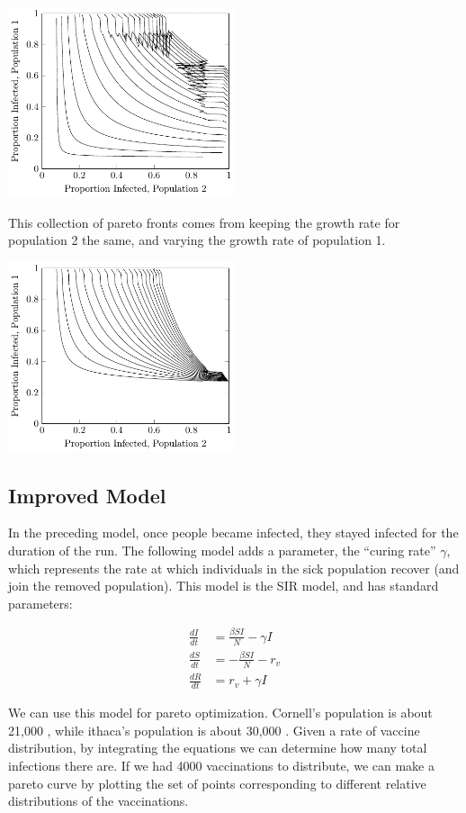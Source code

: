 \documentclass{article}
\begin{document}
\includegraphics[width=0.5\textwidth]{figures/vaccination-model-same-r-pareto-curves.pdf}

This collection of pareto fronts comes from keeping the growth
	rate for population 2 the same, and varying the growth
	rate of population 1.

\includegraphics[width=0.5\textwidth]{figures/vaccination-model-different-r-pareto-curves.pdf}

\subsection{Improved Model}

In the preceding model, once people became infected, they stayed
	infected for the duration of the run.
The following model adds a parameter, the ``curing rate'' $\gamma$,
	which represents the rate at which individuals in the sick population
	recover (and join the removed population).
This model is the SIR model, and has standard parameters:

\begin{align*}
\frac{dI}{dt} & = \frac{ \beta S I}{N} - \gamma I\\
\frac{dS}{dt} & = -\frac{\beta S I}{N} - r_v \\
\frac{dR}{dt} & = r_v + \gamma I 
\end{align*}

We can use this model for pareto optimization.
Cornell's population is about 21,000 \cite{cornellpop},
	while ithaca's population is about 30,000 \cite{census}.
Given a rate of vaccine distribution, by integrating the equations
	we can determine how many total infections there are.
If we had 4000 vaccinations to distribute, we can make a pareto
	curve by plotting the set of points corresponding to different
	relative distributions of the vaccinations.
\end{document}
